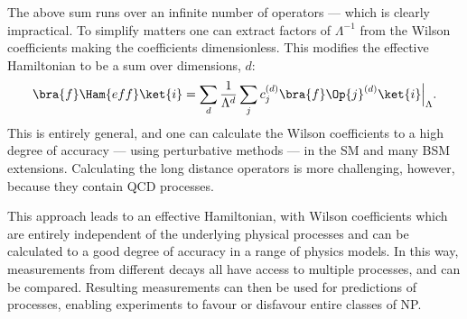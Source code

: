 The above sum runs over an infinite number of operators --- which is clearly impractical.
To simplify matters one can extract factors of $\Lambda^{-1}$ from the Wilson coefficients
making the coefficients dimensionless.
This modifies the effective Hamiltonian to be a sum over dimensions, $d$:
\begin{equation}
  \bra{f}\Ham{eff}\ket{i} =
  \sum_{d}\frac{1}{\Lambda^{d}}
  \sum_j c_j^{(d)}\bra{f}\Op{j}^{(d)}\ket{i}\Big|_{\Lambda}.
  \label{eq:th:opehamnorm}
\end{equation}
This is entirely general, and one can calculate the Wilson coefficients to a high degree of
accuracy --- using perturbative methods --- in the SM and many BSM extensions.
Calculating the long distance operators is more challenging, however, because they contain QCD
processes.

This approach leads to an effective Hamiltonian, with Wilson coefficients which are entirely
independent of the underlying physical processes and can be calculated to a good degree of accuracy
in a range of physics models.
In this way, measurements from different decays all have access to multiple processes, and can be
compared.
Resulting measurements can then be used for predictions of processes, enabling experiments to
favour or disfavour entire classes of NP.



